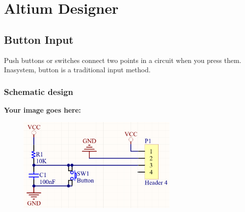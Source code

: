 \section{Altium Designer}
\subsection{Button Input}

Push buttons or switches connect two points in a circuit when you press them. Inasystem,
button is a traditional input method.
\subsubsection{Schematic design}
\textbf{Your image goes here:}
\begin{figure}[h!]
    \centering
    \includegraphics[width=0.7\textwidth]{graphics/ex4/f1.png}
\end{figure}

